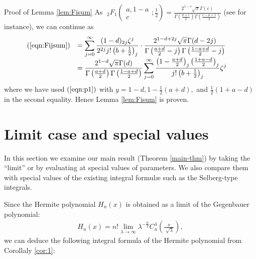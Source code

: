 \documentclass[12pt]{article}
\numberwithin{equation}{section}
\newenvironment{proof*}[1]{\noindent\textbf{#1\ }}{\hspace*{\fill}$\Box$\medskip}
\begin{document}
\begin{proof*}{Proof of Lemma \ref{lem:Fisum}}
  As $\;_2 F_1 \left( \begin{array}{c}
    a, 1 - a\\
    c
  \end{array} ; \displaystyle\frac{1}{2} \right) =\displaystyle \frac{2^{1 - c} \sqrt{\pi} \Gamma
  (c)}{\Gamma \left( \frac{a + c}{2} \right) \Gamma \left( \frac{c - a + 1}{2}
  \right)}$ (see {\cite[Thm. 5.4]{andrews2000special}} for instance), we can
  continue as
  \begin{eqnarray}
    & \begin{array}{ll}
      (\ref{eqn:Fijsum}) & = \displaystyle\sum_{j = 0}^{\infty} \frac{(1 - d)_{2 j}
      \zeta^j}{2^{2 j} j! \left( b + \frac{1}{2} \right)_j} \cdot \frac{2^{1 -
      d + 2 j} \sqrt{\pi} \Gamma (d - 2 j)}{\Gamma \left( \frac{a + d}{2} - j
      \right) \Gamma \left( \frac{1 - a + d}{2} - j \right)}\\
      &\displaystyle = \frac{2^{1 - d} \sqrt{\pi} \Gamma (d)}{\Gamma \left( \frac{a +
      d}{2} \right) \Gamma \left( \frac{1 - a + d}{2} \right)} \displaystyle\sum_{j =
      0}^{\infty} \frac{\left( 1 - \frac{a + d}{2} \right)_j \left( \frac{1 +
      a - d}{2} \right)_j}{j! \left( b + \frac{1}{2} \right)_j} \zeta^j
    \end{array} &  \nonumber
  \end{eqnarray}
  where we have used $(\ref{eqn:p1})$ with $y = 1 - d, 1 - \frac{1}{2} (a +
  d),$ and $\frac{1}{2} (1 + a - d)$ in the second equality. Hence Lemma
  \ref{lem:Fisum} is proven.
\end{proof*}

\section{Limit case and special values}\label{sec:4}

In this section we examine our main result (Theorem \ref{main-thm}) by taking
the ``limit'' or by evaluating at special values of parameters. We also
compare them with special values of the existing integral formul{\ae} such as
the Selberg-type integrals.

Since the Hermite polynomial $H_n (x)$ is obtained as a limit of the
Gegenbauer polynomial:
\begin{eqnarray}
  & H_n (x) = n! \displaystyle\lim_{\lambda \rightarrow \infty} \lambda^{- \frac{n}{2}}
  C_n^{\lambda} \left( \displaystyle\frac{x}{\sqrt[]{\lambda}} \right), &  \nonumber
\end{eqnarray}
we can deduce the following integral formula of the Hermite polynomial from
Corollaly \ref{cor:1}:
\end{document}
